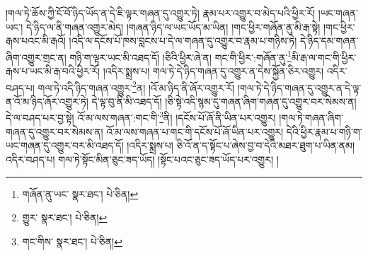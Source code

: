 །གལ་ཏེ་ཆོས་ཀྱི་ངོ་བོ་ཉིད་ཡོད་ན་དེ་ཇི་ལྟར་གཞན་དུ་འགྱུར་ཏེ། རྣམ་པར་འགྱུར་བ་མེད་པའི་ཕྱིར་རོ། །ཡང་གཞན་ཡང་། དེ་ཉིད་ལ་ནི་གཞན་འགྱུར་མེད། །གཞན་ཉིད་ལ་ཡང་ཡོད་མ་ཡིན། །གང་ཕྱིར་གཞོན་ནུ་མི་རྒ་སྟེ། །གང་ཕྱིར་རྒས་པའང་མི་རྒའོ། །འདི་ལ་དངོས་པོ་ཁས་བླངས་པ་དེ་ལ་གཞན་དུ་འགྱུར་བ་རྣམ་པ་གཉིས་ཏེ། དེ་ཉིད་དམ་གཞན་ཞིག་འགྱུར་གྲང་ན། གཉི་ག་ལྟར་ཡང་མི་འཐད་དོ། །ཅིའི་ཕྱིར་ཞེ་ན། གང་གི་ཕྱིར་:གཞོན་ནུ་\footnote{གཞོན་ནུ་ཡང་  སྣར་ཐང་།  པེ་ཅིན། }མི་རྒ་ལ་གང་གི་ཕྱིར་རྒས་པ་ཡང་མི་རྒ་བའི་ཕྱིར་རོ། །འདིར་སྨྲས་པ། གལ་ཏེ་དེ་ཉིད་གཞན་དུ་འགྱུར་ན་དེས་སྐྱོན་ཅིར་འགྱུར། འདིར་བཤད་པ། གལ་ཏེ་འདི་ཉིད་གཞན་འགྱུར་\footnote{གྱུར་  སྣར་ཐང་།  པེ་ཅིན། }ན། །འོ་མ་ཉིད་ནི་ཞོར་འགྱུར་རོ། །གལ་ཏེ་དེ་ཉིད་གཞན་དུ་འགྱུར་ན་དེ་ལྟ་ན་འོ་མ་ཉིད་ཞོར་འགྱུར་ཏེ། དེ་ལྟ་བུ་ནི་མི་འཐད་དོ། །ཅི་སྟེ་འདི་སྙམ་དུ་གཞན་ཞིག་གཞན་དུ་འགྱུར་བར་སེམས་ན། དེ་ལ་བཤད་པར་བྱ་སྟེ། འོ་མ་ལས་གཞན་:གང་གི་\footnote{གང་གིས་  སྣར་ཐང་།  པེ་ཅིན། }ནི། །དངོས་པོ་ཞོ་ནི་ཡིན་པར་འགྱུར། །གལ་ཏེ་གཞན་ཞིག་གཞན་དུ་འགྱུར་བར་སེམས་ན། འོ་མ་ལས་གཞན་པ་གང་གི་དངོས་པོ་ཞོ་ཡིན་པར་འགྱུར། དེའི་ཕྱིར་རྣམ་པ་གཉི་ག་ཡང་གཞན་དུ་འགྱུར་བར་མི་འཐད་དོ། །འདིར་སྨྲས་པ། ཅི་འོ་ན་ད་སྟོང་པ་ཞེས་བྱ་བ་དེའི་མཐར་ཐུག་པ་ཡིན་ནམ། འདིར་བཤད་པ། གལ་ཏེ་སྟོང་མིན་ཅུང་ཟད་ཡོད། །སྟོང་པའང་ཅུང་ཟད་ཡོད་པར་འགྱུར། །

